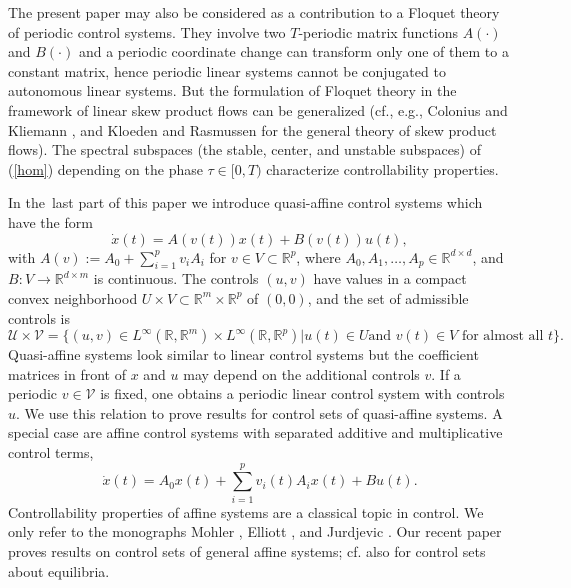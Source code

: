 \documentclass{siamltex}%
\begin{document}
The present paper may also be considered as a contribution to a Floquet theory
of periodic control systems. They involve two $T$-periodic matrix functions
$A(\cdot)$ and $B(\cdot)$ and a periodic coordinate change can transform only
one of them to a constant matrix, hence periodic linear systems cannot be
conjugated to autonomous linear systems. But the formulation of Floquet theory
in the framework of linear skew product flows can be generalized (cf., e.g.,
Colonius and Kliemann \cite[Chapter 7]{ColK14}, and Kloeden and Rasmussen
\cite{KR11} for the general theory of skew product flows). The spectral
subspaces (the stable, center, and unstable subspaces) of (\ref{hom})
depending on the phase $\tau\in\lbrack0,T)$ characterize controllability properties.

In the\ last part of this paper we introduce quasi-affine control systems
which have the form%
\begin{equation}
\dot{x}(t)=A(v(t))x(t)+B(v(t))u(t), \label{qaffine1}%
\end{equation}
with $A(v):=A_{0}+\sum_{i=1}^{p}v_{i}A_{i}$ for $v\in V\subset\mathbb{R}^{p}$,
where $A_{0},A_{1},\ldots,A_{p}\in\mathbb{R}^{d\times d}$, and $B:V\rightarrow
\mathbb{R}^{d\times m}$ is continuous. The controls $(u,v)$ have values in a
compact convex neighborhood $U\times V\subset\mathbb{R}^{m}\times
\mathbb{R}^{p}$ of $(0,0)$, and the set of admissible controls is
\[
\mathcal{U}\times\mathcal{V}=\{(u,v)\in L^{\infty}(\mathbb{R},\mathbb{R}%
^{m})\times L^{\infty}(\mathbb{R},\mathbb{R}^{p})\left\vert u(t)\in U\text{
and }v(t)\in V\text{ for almost all }t\right.  \}.
\]
Quasi-affine systems look similar to linear control systems but the
coefficient matrices in front of $x$ and $u$ may depend on the additional
controls $v$. If a periodic $v\in\mathcal{V}$ is fixed, one obtains a periodic
linear control system with controls $u$. We use this relation to prove results
for control sets of quasi-affine systems. A special case are affine control
systems with separated additive and multiplicative control terms,%
\begin{equation}
\dot{x}(t)=A_{0}x(t)+\sum_{i=1}^{p}v_{i}(t)A_{i}x(t)+Bu(t). \label{affine}%
\end{equation}
Controllability properties of affine systems are a classical topic in control.
We only refer to the monographs Mohler \cite{Mohler}, Elliott \cite{Elliott},
and Jurdjevic \cite{Jurd97}. Our recent paper \cite{ColSS22} proves results on
control sets of general affine systems; cf. also \cite{ColRS} for control sets
about equilibria.
\end{document}
